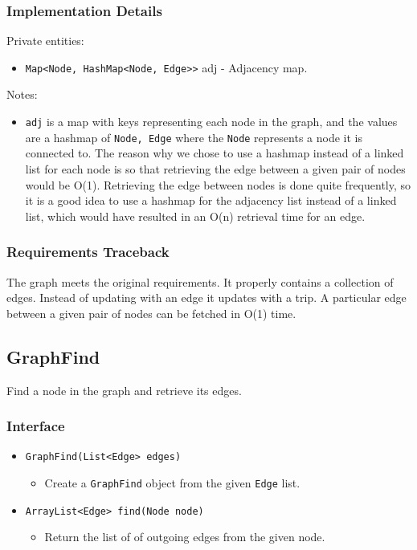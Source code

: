\documentclass[12pt]{article}
\newcommand{\bi}{\begin{itemize}}
\newcommand{\ei}{\end{itemize}}
\newcommand{\code}[1]{\texttt{#1}}
\begin{document}
\subsubsection{Implementation Details}

Private entities:

\bi
	\item \code{Map<Node, HashMap<Node, Edge>>} adj - Adjacency map.
\ei

\noindent Notes:

\bi
    \item \code{adj} is a map with keys representing each node in the graph, and the values are a hashmap of \code{Node, Edge} where the \code{Node} represents a node it is connected to. The reason why we chose to use a hashmap instead of a linked list for each node is so that retrieving the edge between a given pair of nodes would be O(1). Retrieving the edge between nodes is done quite frequently, so it is a good idea to use a hashmap for the adjacency list instead of a linked list, which would have resulted in an O(n) retrieval time for an edge. 
\ei

\subsubsection{Requirements Traceback}

The graph meets the original requirements. It properly contains a collection of edges. Instead of updating with an edge it updates with a trip. A particular edge between a given pair of nodes can be fetched in O(1) time. 
\newpage

\subsection{GraphFind}

Find a node in the graph and retrieve its edges.

\subsubsection{Interface}

\bi
	\item \code{GraphFind(List<Edge> edges)}
	\bi
		\item Create a \code{GraphFind} object from the given \code{Edge} list.
	\ei
	\item \code{ArrayList<Edge> find(Node node)}
	\bi
		\item Return the list of of outgoing edges from the given node.
	\ei
\ei
\end{document}
